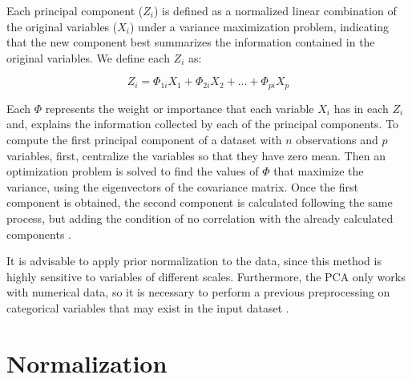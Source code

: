 Each principal component ($Z_i$) is defined as a normalized linear combination of the original variables ($X_i$) under a variance maximization problem, indicating that the new component best summarizes the information contained in the original variables. We define each $Z_i$ as:

\begin{equation}
    Z_i=\Phi_{1i}X_1+\Phi_{2i}X_2+\dots+\Phi_{pi}X_p
\end{equation}

Each $\Phi$ represents the weight or importance that each variable $X_i$ has in each $Z_i$ and, explains the information collected by each of the principal components. To compute the first principal component of a dataset with $n$ observations and $p$ variables, first, centralize the variables so that they have zero mean. Then an optimization problem is solved to find the values of $\Phi$ that maximize the variance, using the eigenvectors of the covariance matrix. Once the first component is obtained, the second component is calculated following the same process, but adding the condition of no correlation with the already calculated components \cite{james2013introduction}.

It is advisable to apply prior normalization to the data, since this method is highly sensitive to variables of different scales. Furthermore, the PCA only works with numerical data, so it is necessary to perform a previous preprocessing on categorical variables that may exist in the input dataset \cite{rodrigo2017un}.

\section{Normalization} \label{sec:normalizar}

